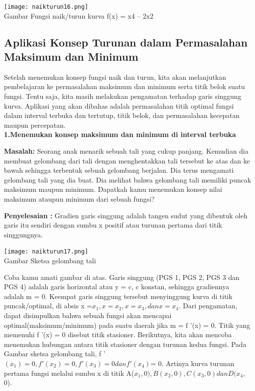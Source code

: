 \documentclass[11pt,fleqn]{book} %
\begin{document}
\begin{center}
\texttt{[image: naikturun16.png]}\\
Gambar Fungsi naik/turun kurva f(x) = x4 – 2x2
\end{center}

\subsection{Aplikasi Konsep Turunan dalam
Permasalahan Maksimum dan Minimum}

Setelah menemukan konsep fungsi naik dan turun,
kita akan melanjutkan pembelajaran ke permasalahan
maksimum dan minimum serta titik belok suatu fungsi.
Tentu saja, kita masih melakukan pengamatan terhadap
garis singgung kurva. Aplikasi yang akan dibahas adalah permasalahan titik optimal fungsi dalam interval terbuka dan tertutup, titik belok, dan permasalahan kecepatan maupun percepatan.\\

\textbf{1.Menemukan konsep maksimum dan minimum di interval terbuka}

\textbf{Masalah: }
Seorang anak menarik sebuah tali yang cukup
panjang. Kemudian dia membuat gelombang dari
tali dengan menghentakkan tali tersebut ke atas dan
ke bawah sehingga terbentuk sebuah gelombang
berjalan. Dia terus mengamati gelombang tali yang
dia buat. Dia melihat bahwa gelombang tali memiliki
puncak maksimum maupun minimum. Dapatkah
kamu menemukan konsep nilai maksimum ataupun
minimum dari sebuah fungsi?

\textbf{Penyelesaian :}
Gradien garis singgung adalah tangen sudut yang
dibentuk oleh garis itu sendiri dengan sumbu x positif atau turunan pertama dari titik singgungnya.

\begin{center}
\texttt{[image: naikturun17.png]}\\
Gambar Sketsa gelombang tali
\end{center}

Coba kamu amati gambar di atas. Garis singgung
(PGS 1, PGS 2, PGS 3 dan PGS 4) adalah garis horizontal atau y = c, c konstan, sehingga gradiennya
adalah m = 0. Keempat garis singgung tersebut menyinggung kurva di titik puncak/optimal, di absis x =$ x_{1}, x = x_{2}, x = x_{3}, dan x = x_{4}$. Dari pengamatan, dapat disimpulkan bahwa sebuah fungsi akan mencapai optimal(maksimum/minimum) pada suatu daerah jika m = f '(x) = 0. Titik yang memenuhi f '(x) = 0 disebut titik stasioner. Berikutnya, kita akan mencoba menemukan hubungan antara titik stasioner dengan turunan kedua fungsi. Pada Gambar sketsa gelombang tali, f '$(x_{1}) = 0, f '(x_{2}) = 0, f '(x_{3}) = 0 dan f '(x_{4}) $= 0. Artinya kurva turunan pertama fungsi melalui sumbu x di titik A($x_{1}, 0), B(x_{2}, 0), C(x_{3}, 0) dan D(x_{4}$, 0).
\end{document}
